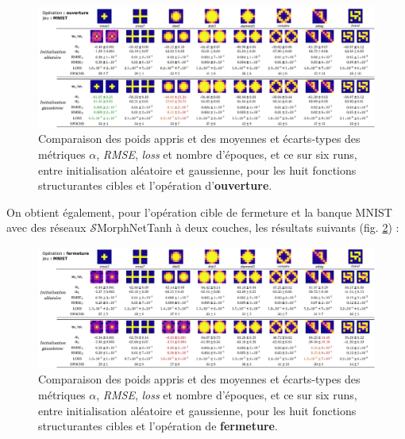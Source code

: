 \vspace{0.1mm}
\begin{figure}[!htp]
  \begin{center}
    \includegraphics[width=1.00\linewidth]{parts/3-contributions/D-modulation_de_l_initialisation/figures/g_opening_mnist.pdf}
    \vspace{-4.0mm}
    \caption{ \centering Comparaison des poids appris et des moyennes et écarts-types des métriques $\alpha$, \textit{RMSE}, \textit{loss} et nombre d'époques, et ce sur six runs, entre initialisation aléatoire et gaussienne, pour les huit fonctions structurantes cibles et l'opération d'\textbf{ouverture}.}
    \label{fig:RANDvsGAUSS_opening}
  \end{center}
\end{figure}


\newpage

On obtient également, pour l’opération cible de fermeture et la banque MNIST avec des réseaux $\mathcal{S}$MorphNetTanh à deux couches, les résultats suivants (fig. \ref{fig:RANDvsGAUSS_closing}) : \\

\vspace{0.2mm}
\begin{figure}[!htp]
  \begin{center}
    \includegraphics[width=1.00\linewidth]{parts/3-contributions/D-modulation_de_l_initialisation/figures/g_closing_mnist.pdf}
    \vspace{-4.0mm}
    \caption{ \centering Comparaison des poids appris et des moyennes et écarts-types des métriques $\alpha$, \textit{RMSE}, \textit{loss} et nombre d'époques, et ce sur six runs, entre initialisation aléatoire et gaussienne, pour les huit fonctions structurantes cibles et l'opération de \textbf{fermeture}.}
    \label{fig:RANDvsGAUSS_closing}
  \end{center}
\end{figure}


